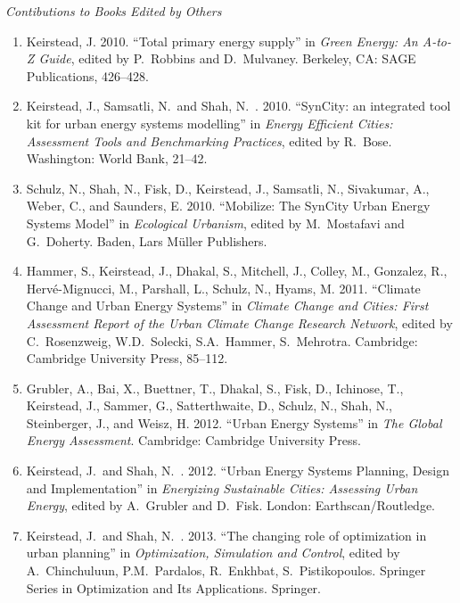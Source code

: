 \documentclass[11pt,a4paper]{article}
\begin{document}
\bigskip

\noindent\emph{Contibutions to Books Edited by Others \vspace{0.01in}}
\begin{enumerate}
\item Keirstead, J. 2010. ``Total primary energy supply'' in \emph{Green Energy: An A-to-Z Guide}, edited by P.\ Robbins and D.\ Mulvaney.  Berkeley, CA: SAGE Publications, 426--428.

\item Keirstead, J., Samsatli, N.\  and Shah, N.\ . 2010. ``SynCity: an integrated tool kit for urban energy systems modelling'' in \emph{Energy Efficient Cities: Assessment Tools and Benchmarking Practices}, edited by R.\ Bose.  Washington: World Bank, 21--42.

\item Schulz, N., Shah, N., Fisk, D., Keirstead, J., Samsatli, N., Sivakumar, A., Weber, C., and Saunders, E. 2010. ``Mobilize: The SynCity Urban Energy Systems Model'' in \emph{Ecological Urbanism}, edited by M.\ Mostafavi and G.\ Doherty.  Baden, Lars M\"{u}ller Publishers.

\item Hammer, S., Keirstead, J., Dhakal, S., Mitchell, J., Colley, M., Gonzalez, R., Herv\'{e}-Mignucci, M., Parshall, L., Schulz, N., Hyams, M. 2011. ``Climate Change and Urban Energy Systems'' in \emph{Climate Change and Cities: First Assessment Report of the Urban Climate Change Research Network}, edited by C.\ Rosenzweig, W.D.\ Solecki, S.A.\ Hammer, S.\ Mehrotra.  Cambridge: Cambridge University Press, 85--112.

\item Grubler, A., Bai, X., Buettner, T., Dhakal, S., Fisk, D., Ichinose, T., Keirstead, J., Sammer, G., Satterthwaite, D., Schulz, N., Shah, N., Steinberger, J., and Weisz, H. 2012. ``Urban Energy Systems'' in \emph{The Global Energy Assessment}. Cambridge: Cambridge University Press.

\item Keirstead, J.\  and Shah, N.\ . 2012. ``Urban Energy Systems Planning, Design and Implementation'' in \emph{Energizing Sustainable Cities: Assessing Urban Energy}, edited by A.\ Grubler and D.\ Fisk. London: Earthscan/Routledge.

\item Keirstead, J.\  and Shah, N.\ . 2013. ``The changing role of optimization in urban planning'' in \emph{Optimization, Simulation and Control}, edited by A.\ Chinchuluun, P.M.\ Pardalos, R.\ Enkhbat, S.\ Pistikopoulos.  Springer Series in Optimization and Its Applications.  Springer.



\end{enumerate}
\end{document}
